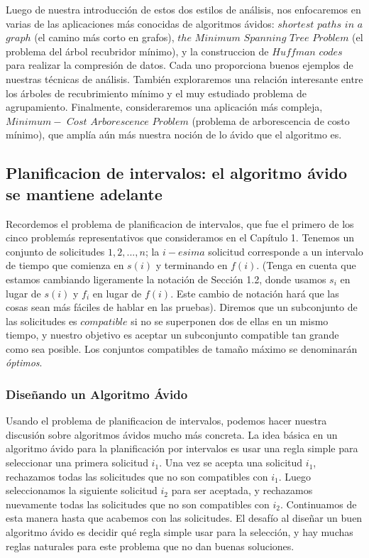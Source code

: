 \documentclass[a4paper]{article}
\begin{document}
Luego de nuestra introducción de estos dos estilos de análisis, nos enfocaremos en varias de las aplicaciones más conocidas de algoritmos ávidos: $shortest$ $paths$ $in$ $a$ $graph$ (el camino más corto en grafos), $the$ $Minimum$ $Spanning$ $Tree$ $Problem$ (el problema del árbol recubridor mínimo), y la construccion de $Huffman$ $codes$ para realizar la compresión de datos. Cada uno proporciona buenos ejemplos de nuestras técnicas de análisis. También exploraremos una relación interesante entre los árboles de recubrimiento mínimo y el muy estudiado problema de agrupamiento. Finalmente, consideraremos una aplicación más compleja, $Minimum-$ $Cost$ $Arborescence$ $Problem$ (problema de arborescencia de costo mínimo), que amplía aún más nuestra noción de lo ávido que el algoritmo es.\\


\subsection{Planificacion de intervalos: el algoritmo ávido se mantiene adelante} Recordemos el problema de planificacion de intervalos, que fue el primero de los cinco problemás representativos que consideramos en el Capítulo 1. Tenemos un conjunto de solicitudes ${1, 2,. . . , n}$; la $i- esima$ solicitud corresponde a un intervalo de tiempo que comienza en $s(i)$ y terminando en $f (i)$. (Tenga en cuenta que estamos cambiando ligeramente la notación de Sección 1.2, donde usamos $s_i$ en lugar de $s(i)$ y $f_i$ en lugar de $f(i)$. Este cambio de notación hará que las cosas sean más fáciles de hablar en las pruebas). Diremos que un subconjunto de las solicitudes es $compatible$ si no se superponen dos de ellas en un mismo tiempo, y nuestro objetivo es aceptar un subconjunto compatible tan grande como sea posible. Los conjuntos compatibles de tamaño máximo se denominarán \textit{óptimos}.\\

\subsubsection*{Diseñando un Algoritmo Ávido}

Usando el problema de planificacion de intervalos, podemos hacer nuestra discusión sobre algoritmos ávidos mucho más concreta. La idea básica en un algoritmo ávido para la planificación por intervalos es usar una regla simple para seleccionar una primera solicitud $i_1$. Una vez se acepta una solicitud $i_1$, rechazamos todas las solicitudes que no son compatibles con $i_1$. Luego seleccionamos la siguiente solicitud $i_2$ para ser aceptada, y rechazamos nuevamente todas las solicitudes que no son compatibles con $i_2$. Continuamos de esta manera hasta que acabemos con las solicitudes. El desafío al diseñar un buen algoritmo ávido es decidir qué regla simple usar para la selección, y hay muchas reglas naturales para este problema que no dan buenas soluciones.\\
\end{document}
